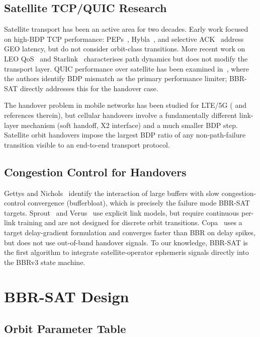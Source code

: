 \documentclass[conference]{IEEEtran}
\begin{document}
\subsection{Satellite TCP/QUIC Research}

Satellite transport has been an active area for two decades.
Early work focused on high-BDP TCP performance:
PEPs~\cite{caini2002}, Hybla~\cite{caini2004}, and
selective ACK~\cite{Henderson2001} address GEO latency, but do not
consider orbit-class transitions.
More recent work on LEO QoS~\cite{bhattacherjee2019} and
Starlink~\cite{michel2022} characterises path dynamics but does not modify
the transport layer.
QUIC performance over satellite has been examined in~\cite{kuhn2020},
where the authors identify BDP mismatch as the primary performance limiter;
BBR-SAT directly addresses this for the handover case.

The handover problem in mobile networks has been studied for LTE/5G
(\cite{makris2019} and references therein), but cellular handovers involve
a fundamentally different link-layer mechanism (soft handoff, X2 interface)
and a much smaller BDP step.
Satellite orbit handovers impose the largest BDP ratio of any
non-path-failure transition visible to an end-to-end transport protocol.

\subsection{Congestion Control for Handovers}

Gettys and Nichols~\cite{gettys2012} identify the interaction of large
buffers with slow congestion-control convergence (bufferbloat), which
is precisely the failure mode BBR-SAT targets.
Sprout~\cite{winstein2013} and Verus~\cite{zaki2015} use explicit link
models, but require continuous per-link training and are not designed for
discrete orbit transitions.
Copa~\cite{arun2018} uses a target delay-gradient formulation and converges
faster than BBR on delay spikes, but does not use out-of-band handover
signals.
To our knowledge, BBR-SAT is the first algorithm to integrate satellite-operator
ephemeris signals directly into the BBRv3 state machine.

\section{BBR-SAT Design}
\label{sec:design}

\subsection{Orbit Parameter Table}
\end{document}
